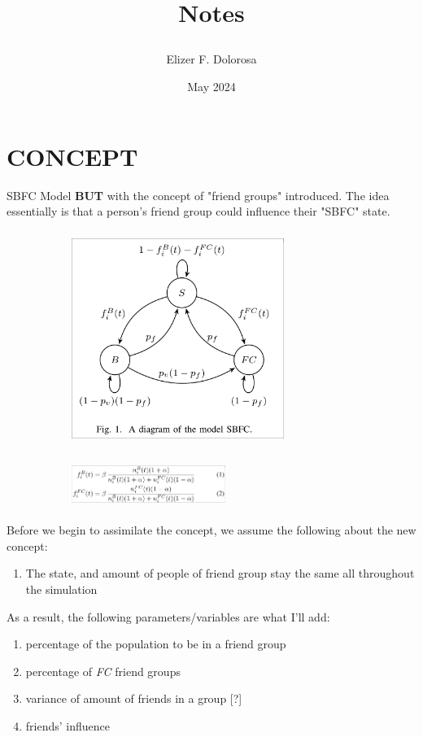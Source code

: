 \documentclass{article}
\title{

  Notes
}
\author{Elizer F. Dolorosa}
\date{May 2024}
\begin{document}
\maketitle

\section{CONCEPT}
SBFC Model \textbf{BUT} with the concept of "friend groups" introduced. The idea essentially is that a person's friend group could influence their "SBFC" state.

\begin{figure}[h]
  \begin{subfigure}{0.57\textwidth}
    \includegraphics[align=c,width=6.9cm, height=7cm]{sbfc-diagram.png}
  \end{subfigure}
  \begin{subfigure}{0.42\textwidth}
    \includegraphics[align=c,width=5cm, height=1.5cm]{transmission-eq.png}
  \end{subfigure}
\end{figure}

Before we begin to assimilate the concept, we assume the following about the new concept:
\begin{enumerate}
  \item The state, and amount of people of friend group stay the same all throughout the simulation
\end{enumerate}

As a result, the following parameters/variables are what I'll add:
\begin{enumerate}
  \item percentage of the population to be in a friend group
  \item percentage of \textit{FC} friend groups
  \item variance of amount of friends in a group [?]
  \item friends' influence
\end{enumerate}
\end{document}
